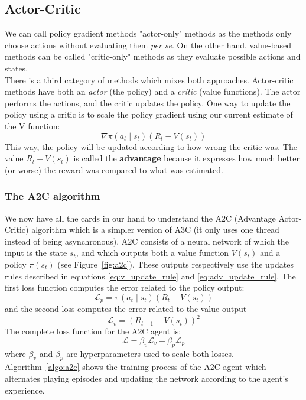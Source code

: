 \subsection{Actor-Critic}
We can call policy gradient methods "actor-only" methods as the methods
only choose actions without evaluating them \textit{per se}. On the other
hand, value-based methods can be called "critic-only" methods as they
evaluate possible actions and states.\\

There is a third category of methods which mixes both approaches. 
Actor-critic methods have both an \textit{actor} (the policy) and a
\textit{critic} (value functions). The actor performs the actions, and the 
critic updates the policy. One way to update the policy using a critic is to
scale the policy gradient using our current estimate of the V function:
\begin{equation}
	\label{eq:adv_update_rule}
\nabla \pi(a_t \mid s_t) (R_t - V(s_t))
\end{equation}
This way, the policy will be updated according to how wrong the critic was.
The value $R_t - V(s_t)$ is called the \textbf{advantage} 
because it expresses how much better (or worse) the reward was compared to 
what was estimated.


\subsubsection{The A2C algorithm}
We now have all the cards in our hand to understand the A2C
(Advantage Actor-Critic) algorithm which is a simpler version of A3C \cite{a3c}
(it only uses one thread instead of being asynchronous). 
A2C consists of a neural network
of which the input is the state $s_t$, and which outputs both a value function
$V(s_t)$ and a policy $\pi(s_t)$ (see Figure~\ref{fig:a2c}). These outputs
respectively use the updates rules described in equations \ref{eq:v_update_rule}
and \ref{eq:adv_update_rule}. The first loss function computes the error
related to the policy output:
$$ \mathcal{L}_p = \pi(a_t \mid s_t) (R_t - V(s_t))$$
and the second loss computes the error related to the value output
$$ \mathcal{L}_v = (R_{t-1} - V(s_t))^2$$
The complete loss function for the A2C agent is:
$$ \mathcal{L} = \beta_v \mathcal{L}_v + \beta_p \mathcal{L}_p $$
where $\beta_v$ and $\beta_p$ are hyperparameters used to scale both losses.\\

Algorithm~\ref{algo:a2c} shows the training
process of the A2C agent which alternates playing episodes and updating the
network according to the agent's experience.

